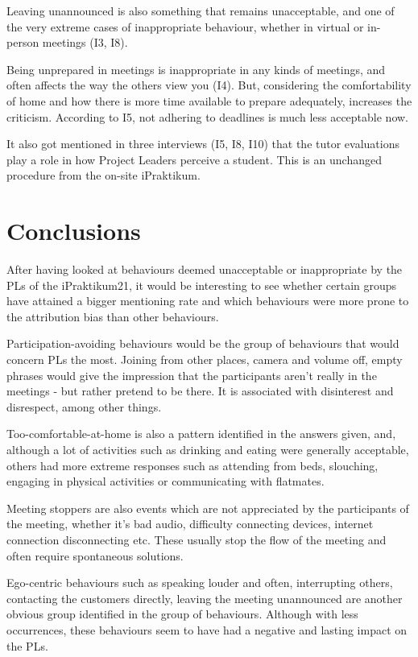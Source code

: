 Leaving unannounced is also something that remains unacceptable, and one of the very extreme cases of inappropriate behaviour, whether in virtual or in-person meetings (I3, I8). 

Being unprepared in meetings is inappropriate in any kinds of meetings, and often affects the way the others view you (I4). But, considering the comfortability of home and how there is more time available to prepare adequately, increases the criticism. According to I5, not adhering to deadlines is much less acceptable now.

It also got mentioned in three interviews (I5, I8, I10) that the tutor evaluations play a role in how Project Leaders perceive a student. This is an unchanged procedure from the on-site iPraktikum. 

\section{Conclusions}\label{Analysis}

After having looked at behaviours deemed unacceptable or inappropriate by the PLs of the iPraktikum21, it would be interesting to see whether certain groups have attained a bigger mentioning rate and which behaviours were more prone to the attribution bias than other behaviours.

Participation-avoiding behaviours would be the group of behaviours that would concern PLs the most. Joining from other places, camera and volume off, empty phrases would give the impression that the participants aren't really in the meetings - but rather pretend to be there. It is associated with disinterest and disrespect, among other things. 

Too-comfortable-at-home is also a pattern identified in the answers given, and, although a lot of activities such as drinking and eating were generally acceptable, others had more extreme responses such as attending from beds, slouching, engaging in physical activities or communicating with flatmates.

Meeting stoppers are also events which are not appreciated by the participants of the meeting, whether it's bad audio, difficulty connecting devices, internet connection disconnecting etc. These usually stop the flow of the meeting and often require spontaneous solutions.

Ego-centric behaviours such as speaking louder and often, interrupting others, contacting the customers directly, leaving the meeting unannounced are another obvious group identified in the group of behaviours. Although with less occurrences, these behaviours seem to have had a negative and lasting impact on the PLs.

